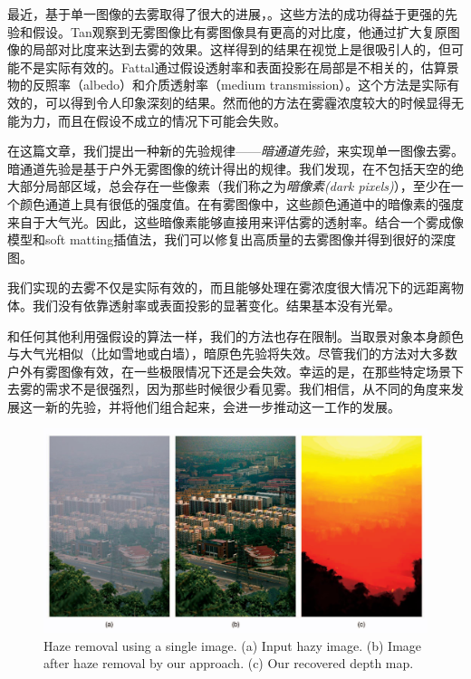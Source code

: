\documentclass{ctexart}
\begin{document}
最近，基于单一图像的去雾取得了很大的进展\cite{Fattal2008}，\cite{Tan2008}。这些方法的成功得益于更强的先验和假设。Tan\cite{Tan2008}观察到无雾图像比有雾图像具有更高的对比度，他通过扩大复原图像的局部对比度来达到去雾的效果。这样得到的结果在视觉上是很吸引人的，但可能不是实际有效的。Fattal\cite{Fattal2008}通过假设透射率和表面投影在局部是不相关的，估算景物的反照率（albedo）和介质透射率（medium transmission）。这个方法是实际有效的，可以得到令人印象深刻的结果。然而他的方法在雾霾浓度较大的时候显得无能为力，而且在假设不成立的情况下可能会失败。\par

在这篇文章，我们提出一种新的先验规律——\emph{暗通道先验}，来实现单一图像去雾。暗通道先验是基于户外无雾图像的统计得出的规律。我们发现，在不包括天空的绝大部分局部区域，总会存在一些像素（我们称之为\emph{暗像素(dark pixels)}），至少在一个颜色通道上具有很低的强度值。在有雾图像中，这些颜色通道中的暗像素的强度来自于大气光。因此，这些暗像素能够直接用来评估雾的透射率。结合一个雾成像模型和soft matting插值法，我们可以修复出高质量的去雾图像并得到很好的深度图。\par

我们实现的去雾不仅是实际有效的，而且能够处理在雾浓度很大情况下的远距离物体。我们没有依靠透射率或表面投影的显著变化。结果基本没有光晕。\par

和任何其他利用强假设的算法一样，我们的方法也存在限制。当取景对象本身颜色与大气光相似（比如雪地或白墙），暗原色先验将失效。尽管我们的方法对大多数户外有雾图像有效，在一些极限情况下还是会失效。幸运的是，在那些特定场景下去雾的需求不是很强烈，因为那些时候很少看见雾。我们相信，从不同的角度来发展这一新的先验，并将他们组合起来，会进一步推动这一工作的发展。\par

\begin{figure}[tbp]
	\centering
	\includegraphics[width=\textwidth]{img/02.jpg}
	\caption{Haze removal using a single image. (a) Input hazy image. (b) Image after haze removal by our approach. (c) Our recovered depth map.}\label{fig:01}
\end{figure}
\end{document}
